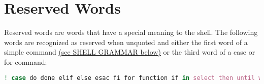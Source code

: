 \section{Reserved Words}
\label{sec:reservedwords}
Reserved words are words that have a special meaning to the shell. The following words are recognized as reserved when unquoted and either the first word of a simple command \hyperref[sec:shellgrammar]{(see SHELL GRAMMAR below)} or the third word of a case or for command:

\begin{lstlisting}[language=bash,breaklines=true]
  ! case do done elif else esac fi for function if in select then until while { } time [[ ]]
\end{lstlisting}